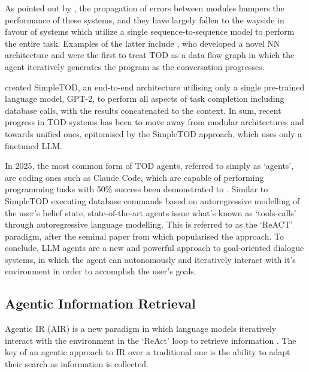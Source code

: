 \documentclass[11pt]{article}
\begin{document}
As pointed out by \citet{yi_survey_2025}, the propagation of errors between modules hampers the performance of these systems, and they have largely fallen to the wayside in favour of systems which utilize a single sequence-to-sequence model to perform the entire task.
Examples of the latter include \citet{wen_network-based_2017}, who developed a novel NN architecture and \citet{andreas_task-oriented_2020} were the first to treat TOD as a data flow graph in which the agent iteratively generates the program as the conversation progresses.

\citet{hosseini-asl_simple_2022} created SimpleTOD, an end-to-end architecture utilising only a single pre-trained language model, GPT-2, to perform all aspects of task completion including database calls, with the results concatenated to the context.
In sum, recent progress in TOD systems has been to move away from modular architectures and towards unified ones, epitomised by the SimpleTOD approach, which uses only a finetuned LLM. 


In 2025, the most common form of TOD agents, referred to simply as `agents', are coding ones such as Claude Code, which are capable of performing programming tasks with 50\% success 
been demonstrated to \cite{kwa_measuring_2025}.
Similar to SimpleTOD executing database commands based on autoregressive modelling of the user's belief state, state-of-the-art agents issue what's known as `tools-calls' through autoregressive language modelling. This is referred to as the `ReACT' paradigm, after the seminal paper from \citet{yao_reac_2023} which popularised the approach. To conclude, LLM agents are a new and powerful approach to goal-oriented dialogue systems, in which the agent can autonomously and iteratively interact with it's environment in order to accomplish the user's goals.


\subsection{Agentic Information Retrieval}
Agentic IR (AIR) is a new paradigm in which language models iteratively interact with the environment in the `ReAct' loop to retrieve information \citet{zhang_agentic_2025}.
The key of an agentic approach to IR over a traditional one is the ability to adapt their search as information is collected.
\end{document}
